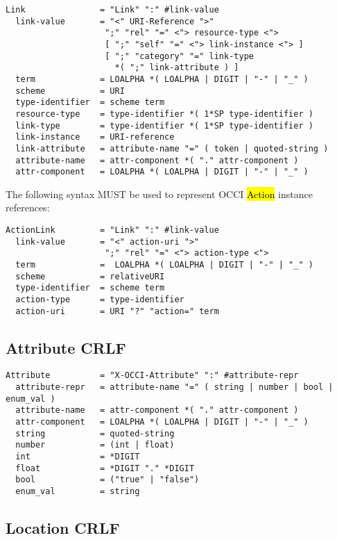 \documentclass[10pt,a4paper]{article}
\begin{document}
\begin{verbatim}
Link               = "Link" ":" #link-value
  link-value       = "<" URI-Reference ">"
                    ";" "rel" "=" <"> resource-type <">
                    [ ";" "self" "=" <"> link-instance <"> ]
                    [ ";" "category" "=" link-type
                      *( ";" link-attribute ) ]
  term             = LOALPHA *( LOALPHA | DIGIT | "-" | "_" )
  scheme           = URI
  type-identifier  = scheme term
  resource-type    = type-identifier *( 1*SP type-identifier )
  link-type        = type-identifier *( 1*SP type-identifier )
  link-instance    = URI-reference
  link-attribute   = attribute-name "=" ( token | quoted-string )
  attribute-name   = attr-component *( "." attr-component )
  attr-component   = LOALPHA *( LOALPHA | DIGIT | "-" | "_" )
\end{verbatim}

The following syntax MUST be used to represent OCCI \hl{Action}
instance references:

\begin{verbatim}
ActionLink         = "Link" ":" #link-value
  link-value       = "<" action-uri ">"
                    ";" "rel" "=" <"> action-type <">
  term             =  LOALPHA *( LOALPHA | DIGIT | "-" | "_" )
  scheme           = relativeURI
  type-identifier  = scheme term
  action-type      = type-identifier
  action-uri       = URI "?" "action=" term
\end{verbatim}

\subsection{Attribute CRLF}

\begin{verbatim}
Attribute          = "X-OCCI-Attribute" ":" #attribute-repr
  attribute-repr   = attribute-name "=" ( string | number | bool | enum_val )
  attribute-name   = attr-component *( "." attr-component )
  attr-component   = LOALPHA *( LOALPHA | DIGIT | "-" | "_" )	
  string           = quoted-string
  number           = (int | float)
  int              = *DIGIT
  float            = *DIGIT "." *DIGIT
  bool             = ("true" | "false")
  enum_val         = string
\end{verbatim}

\subsection{Location CRLF}
\end{document}
